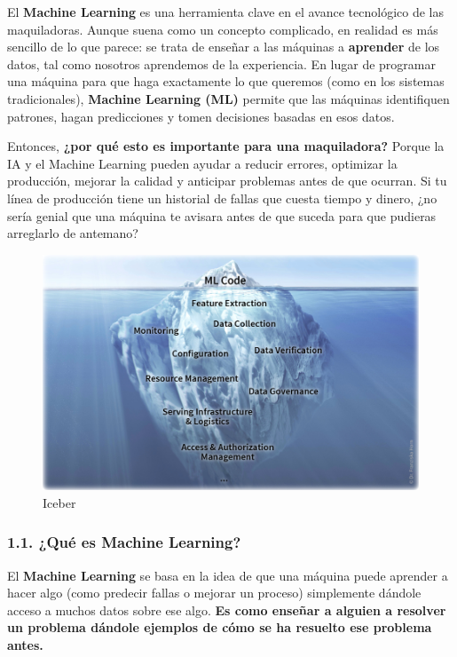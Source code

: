 \documentclass[
  10pt,
  letterpaper,
]{book}
\begin{document}
El \textbf{Machine Learning} es una herramienta clave en el avance
tecnológico de las maquiladoras. Aunque suena como un concepto
complicado, en realidad es más sencillo de lo que parece: se trata de
enseñar a las máquinas a \textbf{aprender} de los datos, tal como
nosotros aprendemos de la experiencia. En lugar de programar una máquina
para que haga exactamente lo que queremos (como en los sistemas
tradicionales), \textbf{Machine Learning (ML)} permite que las máquinas
identifiquen patrones, hagan predicciones y tomen decisiones basadas en
esos datos.

Entonces, \textbf{¿por qué esto es importante para una maquiladora?}
Porque la IA y el Machine Learning pueden ayudar a reducir errores,
optimizar la producción, mejorar la calidad y anticipar problemas antes
de que ocurran. Si tu línea de producción tiene un historial de fallas
que cuesta tiempo y dinero, ¿no sería genial que una máquina te avisara
antes de que suceda para que pudieras arreglarlo de antemano?

\begin{figure}[H]

{\centering \includegraphics{Img/imagen_186.jpg}

}

\caption{Iceber}

\end{figure}%

\subsubsection{\texorpdfstring{\textbf{1.1. ¿Qué es Machine
Learning?}}{1.1. ¿Qué es Machine Learning?}}\label{quuxe9-es-machine-learning}

El \textbf{Machine Learning} se basa en la idea de que una máquina puede
aprender a hacer algo (como predecir fallas o mejorar un proceso)
simplemente dándole acceso a muchos datos sobre ese algo. \textbf{Es
como enseñar a alguien a resolver un problema dándole ejemplos de cómo
se ha resuelto ese problema antes.}
\end{document}
